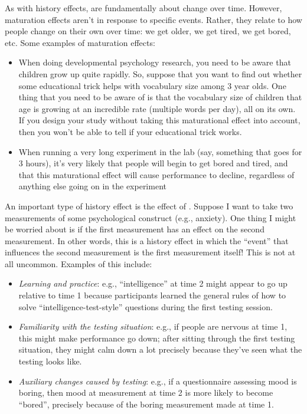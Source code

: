
As with history effects,  are fundamentally about change over time. However, maturation effects aren't in response to specific events. Rather, they relate to how people change on their own over time: we get older, we get tired, we get bored, etc. Some examples of maturation effects:

\begin{itemize}
\item When doing developmental psychology research, you need to be aware that children grow up quite rapidly. So, suppose that you want to find out whether some educational trick helps with  vocabulary size among 3 year olds. One thing that you need to be aware of is that the vocabulary size of children that age is growing at an incredible rate (multiple words per day), all on its own. If you design your study without taking this maturational effect into account, then you won't be able to tell if your educational trick works.
\item When running a very long experiment in the lab (say, something that goes for 3 hours), it's very likely that people will begin to get bored and tired, and that this maturational effect will cause performance to decline, regardless of anything else going on in the experiment
\end{itemize}


  
 

An important type of history effect is the effect of . Suppose I want to take two measurements of some psychological construct (e.g., anxiety). One thing I might be worried about is if the first measurement has an effect on the second measurement. In other words, this is a history effect in which the ``event'' that influences the second measurement is the first measurement itself! This is not at all uncommon. Examples of this include:

\begin{itemize}
\item {\it Learning and practice}: e.g., ``intelligence'' at time 2 might appear to go up relative to time 1 because participants learned the general rules of how to solve ``intelligence-test-style'' questions during the first testing session.  
\item {\it Familiarity with the testing situation}: e.g., if people are nervous at time 1, this might make performance go down; after sitting through the first testing situation, they might calm down a lot precisely because they've seen what the testing looks like. 
\item {\it Auxiliary changes caused by testing}: e.g., if a questionnaire assessing mood is boring, then mood at measurement at time 2 is more likely to become ``bored'', precisely because of the boring measurement made at time 1. 
\end{itemize}


